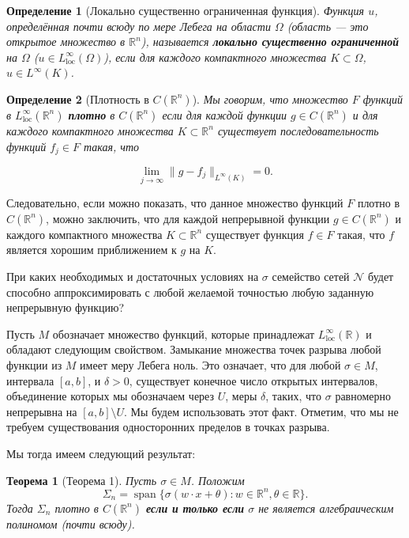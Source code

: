\documentclass[12pt]{article}
\newtheorem{theorem}{Теорема}
\newtheorem{definition}{Определение}
\begin{document}
	\begin{definition}[Локально существенно ограниченная функция]
		Функция $u$, определённая почти всюду по мере Лебега на области $\Omega$ (область — это открытое множество в $\mathbb{R}^n$), называется \textbf{локально существенно ограниченной} на $\Omega$ ($u \in L^\infty_{\text{loc}}(\Omega)$), если для каждого компактного множества $K \subset \Omega$, $u \in L^\infty(K)$.
	\end{definition}
	
	\begin{definition}[Плотность в $C(\mathbb{R}^n)$]
		Мы говорим, что множество $F$ функций в $L^\infty_{\text{loc}}(\mathbb{R}^n)$ \textbf{плотно} в $C(\mathbb{R}^n)$ если для каждой функции $g \in C(\mathbb{R}^n)$ и для каждого компактного множества $K \subset \mathbb{R}^n$ существует последовательность функций $f_j \in F$ такая, что
		
		\[
		\lim_{j \to \infty} \| g - f_j \|_{L^\infty(K)} = 0.
		\]
		
	\end{definition}
		
		Следовательно, если можно показать, что данное множество функций $F$ плотно в $C(\mathbb{R}^n)$, можно заключить, что для каждой непрерывной функции $g \in C(\mathbb{R}^n)$ и каждого компактного множества $K \subset \mathbb{R}^n$ существует функция $f \in F$ такая, что $f$ является хорошим приближением к $g$ на $K$. 
		
		При каких необходимых и достаточных условиях на $\sigma$ семейство сетей $\mathcal{N}$ будет способно аппроксимировать с любой желаемой точностью любую заданную непрерывную функцию?
		
		Пусть $M$ обозначает множество функций, которые принадлежат $L^\infty_{\text{loc}}(\mathbb{R})$ и обладают следующим свойством. Замыкание множества точек разрыва любой функции из $M$ имеет меру Лебега ноль. Это означает, что для любой $\sigma \in M$, интервала $[a, b]$, и $\delta > 0$, существует конечное число открытых интервалов, объединение которых мы обозначаем через $U$, меры $\delta$, таких, что $\sigma$ равномерно непрерывна на $[a, b] \setminus U$. Мы будем использовать этот факт. Отметим, что мы не требуем существования односторонних пределов в точках разрыва.
		
		Мы тогда имеем следующий результат:
		
		\begin{theorem}[Теорема 1]
			Пусть $\sigma \in M$. Положим
			\[
			\Sigma_n = \operatorname{span}\{ \sigma(w \cdot x + \theta) : w \in \mathbb{R}^n, \theta \in \mathbb{R} \}.
			\]
			Тогда $\Sigma_n$ плотно в $C(\mathbb{R}^n)$ \textbf{если и только если} $\sigma$ не является алгебраическим полиномом (почти всюду).
		\end{theorem}
		
\end{document}
